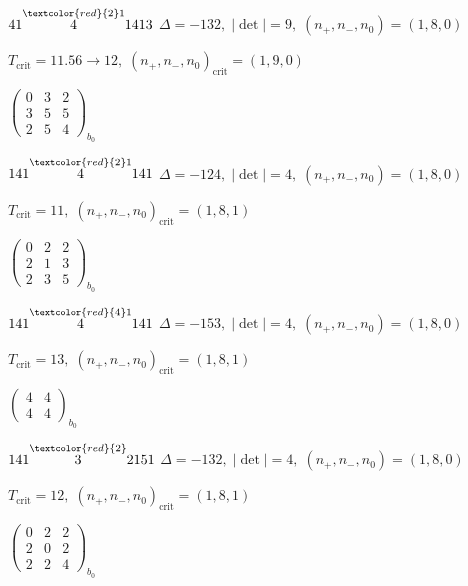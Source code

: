 \documentclass[10pt]{article}
\begin{document}
\smallskip

$41\overset{\textcolor{red}{2}1}{4}1413$ \quad $\Delta=-132,\; |\det|=9,\; (n_+,n_-,n_0)=(1,8,0)$

\hspace{1em}$T_{\text{crit}}=11.56 \to 12,\; (n_+,n_-,n_0)_{\text{crit}}=(1,9,0)$

\hspace{2em}$\left(\begin{smallmatrix}0 & 3 & 2 \\ 3 & 5 & 5 \\ 2 & 5 & 4\end{smallmatrix}\right)_{\!b_0}$

\smallskip

$141\overset{\textcolor{red}{2}1}{4}141$ \quad $\Delta=-124,\; |\det|=4,\; (n_+,n_-,n_0)=(1,8,0)$

\hspace{1em}$T_{\text{crit}}=11,\; (n_+,n_-,n_0)_{\text{crit}}=(1,8,1)$

\hspace{2em}$\left(\begin{smallmatrix}0 & 2 & 2 \\ 2 & 1 & 3 \\ 2 & 3 & 5\end{smallmatrix}\right)_{\!b_0}$

$141\overset{\textcolor{red}{4}1}{4}141$ \quad $\Delta=-153,\; |\det|=4,\; (n_+,n_-,n_0)=(1,8,0)$

\hspace{1em}$T_{\text{crit}}=13,\; (n_+,n_-,n_0)_{\text{crit}}=(1,8,1)$

\hspace{2em}$\left(\begin{smallmatrix}4 & 4 \\ 4 & 4\end{smallmatrix}\right)_{\!b_0}$

\smallskip

$141\overset{\textcolor{red}{2}}{3}2151$ \quad $\Delta=-132,\; |\det|=4,\; (n_+,n_-,n_0)=(1,8,0)$

\hspace{1em}$T_{\text{crit}}=12,\; (n_+,n_-,n_0)_{\text{crit}}=(1,8,1)$

\hspace{2em}$\left(\begin{smallmatrix}0 & 2 & 2 \\ 2 & 0 & 2 \\ 2 & 2 & 4\end{smallmatrix}\right)_{\!b_0}$
\end{document}
